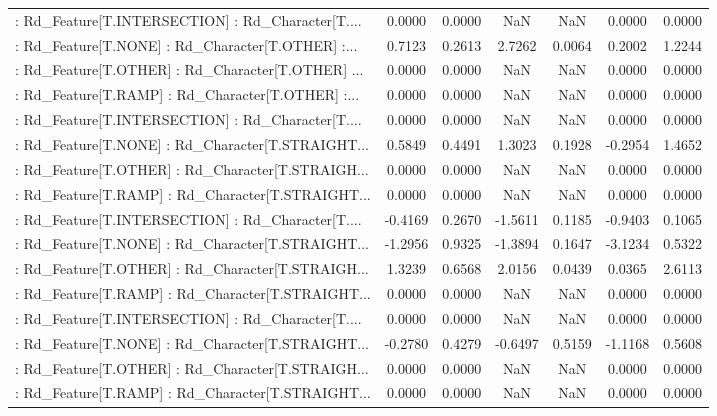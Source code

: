 \begin{longtable}{p{4cm}cccccc}
 : Rd\_Feature[T.INTERSECTION] : Rd\_Character[T.... &  0.0000 &    0.0000 &     NaN &          NaN &  0.0000 &  0.0000 \\
 : Rd\_Feature[T.NONE] : Rd\_Character[T.OTHER] :... &  0.7123 &    0.2613 &  2.7262 &       0.0064 &  0.2002 &  1.2244 \\
 : Rd\_Feature[T.OTHER] : Rd\_Character[T.OTHER] ... &  0.0000 &    0.0000 &     NaN &          NaN &  0.0000 &  0.0000 \\
 : Rd\_Feature[T.RAMP] : Rd\_Character[T.OTHER] :... &  0.0000 &    0.0000 &     NaN &          NaN &  0.0000 &  0.0000 \\
 : Rd\_Feature[T.INTERSECTION] : Rd\_Character[T.... &  0.0000 &    0.0000 &     NaN &          NaN &  0.0000 &  0.0000 \\
 : Rd\_Feature[T.NONE] : Rd\_Character[T.STRAIGHT... &  0.5849 &    0.4491 &  1.3023 &       0.1928 & -0.2954 &  1.4652 \\
 : Rd\_Feature[T.OTHER] : Rd\_Character[T.STRAIGH... &  0.0000 &    0.0000 &     NaN &          NaN &  0.0000 &  0.0000 \\
 : Rd\_Feature[T.RAMP] : Rd\_Character[T.STRAIGHT... &  0.0000 &    0.0000 &     NaN &          NaN &  0.0000 &  0.0000 \\
 : Rd\_Feature[T.INTERSECTION] : Rd\_Character[T.... & -0.4169 &    0.2670 & -1.5611 &       0.1185 & -0.9403 &  0.1065 \\
 : Rd\_Feature[T.NONE] : Rd\_Character[T.STRAIGHT... & -1.2956 &    0.9325 & -1.3894 &       0.1647 & -3.1234 &  0.5322 \\
 : Rd\_Feature[T.OTHER] : Rd\_Character[T.STRAIGH... &  1.3239 &    0.6568 &  2.0156 &       0.0439 &  0.0365 &  2.6113 \\
 : Rd\_Feature[T.RAMP] : Rd\_Character[T.STRAIGHT... &  0.0000 &    0.0000 &     NaN &          NaN &  0.0000 &  0.0000 \\
 : Rd\_Feature[T.INTERSECTION] : Rd\_Character[T.... &  0.0000 &    0.0000 &     NaN &          NaN &  0.0000 &  0.0000 \\
 : Rd\_Feature[T.NONE] : Rd\_Character[T.STRAIGHT... & -0.2780 &    0.4279 & -0.6497 &       0.5159 & -1.1168 &  0.5608 \\
 : Rd\_Feature[T.OTHER] : Rd\_Character[T.STRAIGH... &  0.0000 &    0.0000 &     NaN &          NaN &  0.0000 &  0.0000 \\
 : Rd\_Feature[T.RAMP] : Rd\_Character[T.STRAIGHT... &  0.0000 &    0.0000 &     NaN &          NaN &  0.0000 &  0.0000 \\

\end{longtable}
